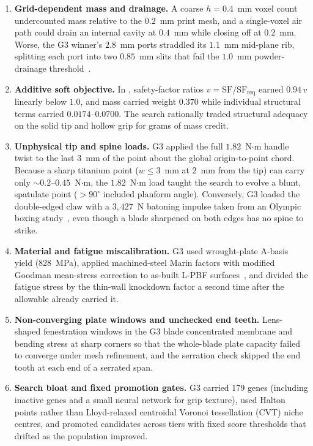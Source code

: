 \begin{enumerate}
\item \textbf{Grid-dependent mass and drainage.} A coarse $h = 0.4$~mm voxel count undercounted mass relative to the
$0.2$~mm print mesh, and a single-voxel air path could drain an internal cavity at $0.4$~mm while closing off at $0.2$~mm.
Worse, the G3 winner's $2.8$~mm ports straddled its $1.1$~mm mid-plane rib, splitting each port into two $0.85$~mm slits
that fail the $1.0$~mm powder-drainage threshold~\cite{carrozza2023}.
\item \textbf{Additive soft objective.} In , safety-factor ratios $v = \mathrm{SF}/\mathrm{SF}_\mathrm{req}$
earned $0.94\,v$ linearly below $1.0$, and mass carried weight $0.370$ while individual structural terms carried
$0.0174$--$0.0700$. The search rationally traded structural adequacy on the solid tip and hollow grip for grams of mass
credit.
\item \textbf{Unphysical tip and spine loads.} G3 applied the full $1.82$~N$\cdot$m handle twist to the last $3$~mm of the
point about the global origin-to-point chord. Because a sharp titanium point ($w \le 3$~mm at $2$~mm from the tip) can carry
only $\sim 0.2$--$0.45$~N$\cdot$m, the $1.82$~N$\cdot$m load taught the search to evolve a blunt, spatulate point
($> 90^\circ$ included planform angle). Conversely, G3 loaded the double-edged claw with a $3,427$~N batoning impulse taken
from an Olympic boxing study~\cite{walilko2005}, even though a blade sharpened on both edges has no spine to strike.
\item \textbf{Material and fatigue miscalibration.} G3 used wrought-plate A-basis yield ($828$~MPa), applied machined-steel
Marin factors with modified Goodman mean-stress correction to as-built L-PBF surfaces~\cite{benedetti2018,johnsen2024}, and
divided the fatigue stress by the thin-wall knockdown factor a second time after the allowable already carried it.
\item \textbf{Non-converging plate windows and unchecked end teeth.} Lens-shaped fenestration windows in the G3 blade
concentrated membrane and bending stress at sharp corners so that the whole-blade plate capacity failed to converge under
mesh refinement, and the serration check skipped the end tooth at each end of a serrated span.
\item \textbf{Search bloat and fixed promotion gates.} G3 carried 179 genes (including inactive genes and a small neural
network for grip texture), used Halton points rather than Lloyd-relaxed centroidal Voronoi tessellation (CVT) niche
centres, and promoted candidates across tiers with fixed score thresholds that drifted as the population improved.
\end{enumerate}

